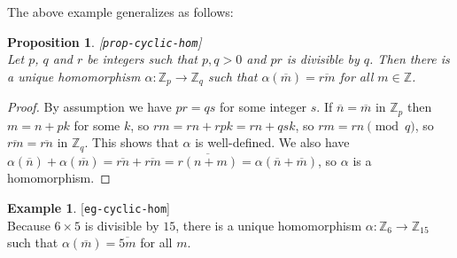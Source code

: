 \documentclass{amsart}
\newcommand{\lbl}[1]{\label{#1}\textup{[\texttt{#1}]}\ \\}
\newcommand{\lbl}{\label}
\newcommand{\Z}         {{\mathbb{Z}}}
\newcommand{\al}        {\alpha}
\newcommand{\ov}[1]     {\overline{#1}}
\newcommand{\tm}        {\times}
\newcommand{\xra}       {\xrightarrow}
\renewcommand{\:}{\colon}
\newtheorem{proposition}[theorem]{Proposition}
\theoremstyle{definition}
\newtheorem{example}[theorem]{Example}
\begin{document}
The above example generalizes as follows:
\begin{proposition}\lbl{prop-cyclic-hom}
 Let $p$, $q$ and $r$ be integers such that $p,q>0$ and $pr$ is
 divisible by $q$.  Then there is a unique homomorphism
 $\al\:\Z_p\xra{}\Z_q$ such that $\al(\ov{m})=\ov{rm}$ for all
 $m\in\Z$.  
\end{proposition}
\begin{proof}
 By assumption we have $pr=qs$ for some integer $s$.  If
 $\ov{n}=\ov{m}$ in $\Z_p$ then $m=n+pk$ for some $k$, so
 $rm=rn+rpk=rn+qsk$, so $rm=rn\pmod{q}$, so $\ov{rm}=\ov{rn}$ in
 $\Z_q$.  This shows that $\al$ is well-defined.  We also have 
 $\al(\ov{n})+\al(\ov{m})=\ov{rn}+\ov{rm}=
  \ov{r(n+m)}=\al(\ov{n}+\ov{m})$, so $\al$ is a homomorphism.
\end{proof}
\begin{example}\lbl{eg-cyclic-hom}
 Because $6\tm 5$ is divisible by $15$, there is a unique homomorphism
 $\al\:\Z_6\xra{}\Z_{15}$ such that $\al(\ov{m})=\ov{5m}$ for all $m$.
\end{example}
\end{document}
